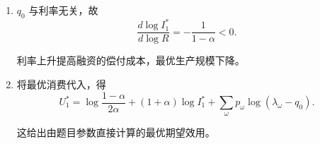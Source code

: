 \begin{solution}[blank-type=manual,blank-vsep=9\baselineskip]
\begin{enumerate}[label=(\alph*)]
债券头寸为 $-D_1^*=-q_0(I_1^*)^\alpha$，即卖出相应到期支付。消去 $D$ 后，每个 $c_\omega=\lambda_\omega I^\alpha-R(c_0+I)$ 都是凹函数，正消费可行域为凸集。对 $c_0$ 的对数项及产出对 $I$ 的严格凹性使目标严格凹，因此上述可行的一阶解是唯一最优解。
\item $q_0$ 与利率无关，故
\[
 \frac{d\log I_1^*}{d\log R}=-\frac1{1-\alpha}<0.
\]

利率上升提高融资的偿付成本，最优生产规模下降。
\item 将最优消费代入，得
\[
 U_1^*=\log\frac{1-\alpha}{2\alpha}
 +(1+\alpha)\log I_1^*
 +\sum_\omega p_\omega\log(\lambda_\omega-q_0).
\]

这给出由题目参数直接计算的最优期望效用。\qedhere
\end{enumerate}
\end{solution}

